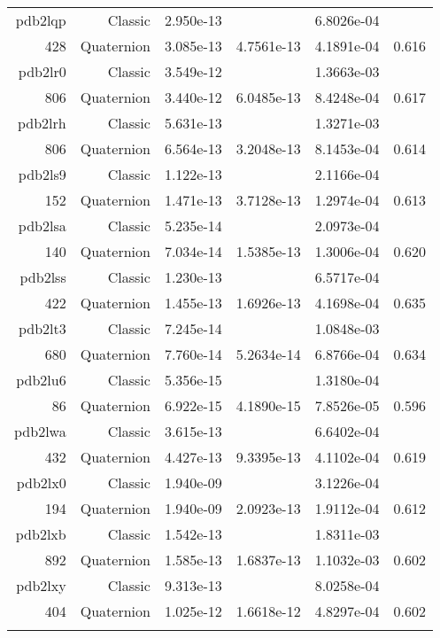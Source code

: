 \begin{xltabular}{\textwidth}{r|rS[table-format=1.3e+2]S[table-format=1.4e+2]S[table-format=1.4e+2]S[table-format=-1.3]}
pdb2lqp & Classic & 2.950e-13 &  & 6.8026e-04 & \\
428 & Quaternion & 3.085e-13 & 4.7561e-13 & 4.1891e-04 & 0.616\\  \addlinespace
pdb2lr0 & Classic & 3.549e-12 &  & 1.3663e-03 & \\
806 & Quaternion & 3.440e-12 & 6.0485e-13 & 8.4248e-04 & 0.617\\  \addlinespace
pdb2lrh & Classic & 5.631e-13 &  & 1.3271e-03 & \\
806 & Quaternion & 6.564e-13 & 3.2048e-13 & 8.1453e-04 & 0.614\\  \addlinespace
pdb2ls9 & Classic & 1.122e-13 &  & 2.1166e-04 & \\
152 & Quaternion & 1.471e-13 & 3.7128e-13 & 1.2974e-04 & 0.613\\  \addlinespace
pdb2lsa & Classic & 5.235e-14 &  & 2.0973e-04 & \\
140 & Quaternion & 7.034e-14 & 1.5385e-13 & 1.3006e-04 & 0.620\\  \addlinespace
pdb2lss & Classic & 1.230e-13 &  & 6.5717e-04 & \\
422 & Quaternion & 1.455e-13 & 1.6926e-13 & 4.1698e-04 & 0.635\\  \addlinespace
pdb2lt3 & Classic & 7.245e-14 &  & 1.0848e-03 & \\
680 & Quaternion & 7.760e-14 & 5.2634e-14 & 6.8766e-04 & 0.634\\  \addlinespace
pdb2lu6 & Classic & 5.356e-15 &  & 1.3180e-04 & \\
86 & Quaternion & 6.922e-15 & 4.1890e-15 & 7.8526e-05 & 0.596\\  \addlinespace
pdb2lwa & Classic & 3.615e-13 &  & 6.6402e-04 & \\
432 & Quaternion & 4.427e-13 & 9.3395e-13 & 4.1102e-04 & 0.619\\  \addlinespace
pdb2lx0 & Classic & 1.940e-09 &  & 3.1226e-04 & \\
194 & Quaternion & 1.940e-09 & 2.0923e-13 & 1.9112e-04 & 0.612\\  \addlinespace
pdb2lxb & Classic & 1.542e-13 &  & 1.8311e-03 & \\
892 & Quaternion & 1.585e-13 & 1.6837e-13 & 1.1032e-03 & 0.602\\  \addlinespace
pdb2lxy & Classic & 9.313e-13 &  & 8.0258e-04 & \\
404 & Quaternion & 1.025e-12 & 1.6618e-12 & 4.8297e-04 & 0.602\\  \addlinespace

\end{xltabular}
